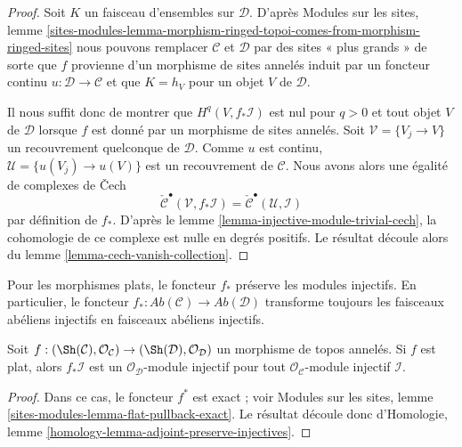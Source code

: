 \begin{proof}
Soit $K$ un faisceau d'ensembles sur $\mathcal{D}$.
D'après Modules sur les sites, lemme
\ref{sites-modules-lemma-morphism-ringed-topoi-comes-from-morphism-ringed-sites}
nous pouvons remplacer $\mathcal{C}$ et $\mathcal{D}$ par des sites « plus
grands » de sorte que $f$ provienne d'un morphisme de sites annelés induit par
un foncteur continu $u : \mathcal{D} \to \mathcal{C}$ et que $K = h_V$ pour
un objet $V$ de $\mathcal{D}$.

\medskip\noindent
Il nous suffit donc de montrer que $H^q(V, f_*\mathcal{I})$ est nul pour
$q > 0$ et tout objet $V$ de $\mathcal{D}$ lorsque $f$ est donné par un
morphisme de sites annelés. Soit $\mathcal{V} = \{V_j \to V\}$ un
recouvrement quelconque de $\mathcal{D}$. Comme $u$ est continu,
$\mathcal{U} = \{u(V_j) \to u(V)\}$ est un recouvrement de $\mathcal{C}$.
Nous avons alors une égalité de complexes de {\v C}ech
$$
\check{\mathcal{C}}^\bullet(\mathcal{V}, f_*\mathcal{I})
=
\check{\mathcal{C}}^\bullet(\mathcal{U}, \mathcal{I})
$$
par définition de $f_*$. D'après le
lemme \ref{lemma-injective-module-trivial-cech}, la cohomologie de ce complexe
est nulle en degrés positifs. Le résultat découle alors du
lemme \ref{lemma-cech-vanish-collection}.
\end{proof}

\noindent
Pour les morphismes plats, le foncteur $f_*$ préserve les modules injectifs.
En particulier, le foncteur
$f_* : \textit{Ab}(\mathcal{C}) \to \textit{Ab}(\mathcal{D})$ transforme
toujours les faisceaux abéliens injectifs en faisceaux abéliens injectifs.

\begin{lemma}
\label{lemma-pushforward-injective-flat}
Soit $f : (\Sh(\mathcal{C}), \mathcal{O}_\mathcal{C}) \to
(\Sh(\mathcal{D}), \mathcal{O}_\mathcal{D})$ un morphisme de topos annelés.
Si $f$ est plat, alors $f_*\mathcal{I}$ est un
$\mathcal{O}_\mathcal{D}$-module injectif pour tout
$\mathcal{O}_\mathcal{C}$-module injectif $\mathcal{I}$.
\end{lemma}

\begin{proof}
Dans ce cas, le foncteur $f^*$ est exact ; voir Modules sur les sites,
lemme \ref{sites-modules-lemma-flat-pullback-exact}.
Le résultat découle donc d'Homologie,
lemme \ref{homology-lemma-adjoint-preserve-injectives}.
\end{proof}

